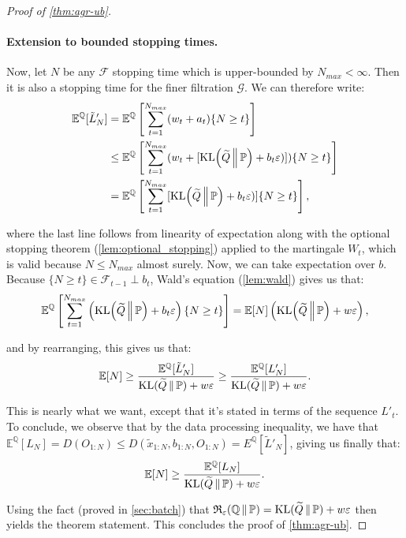 \documentclass{article}
\DeclareMathOperator{\KLop}{KL}
\newcommand{\KL}[2]{%
  \mathchoice
    {\KLop\!\left(#1\,\middle\|\,#2\right)}%
    {\KLop(#1\,\Vert\,#2)}%
    {\KLop(#1\,\Vert\,#2)}%
    {\KLop(#1\,\Vert\,#2)}%
}
\newcommand{\Rdiv}[3][\eps]{%
  \mathfrak{R}_{#1}\!\left(#2\,\middle\|\,#3\right)%
}
\newcommand{\Null}{\mathbb{P}}
\newcommand{\E}{\mathbb{E}}
\newcommand{\Alt}{\mathbb{Q}}
\newcommand{\opt}{\Rdiv{\Alt}{\Null}}
\newcommand{\eps}{\varepsilon}
\begin{document}
\begin{proof}[Proof of \cref{thm:agr-ub}]
    \paragraph{Extension to bounded stopping times. }
    Now, let $N$ be any $\mathcal{F}$ stopping time which is upper-bounded by $N_{max} < \infty$. Then it is also a stopping time for the finer filtration $\mathcal{G}$. We can therefore write:
    \begin{align*}
        \E^\Alt[\tilde L'_N] &= \E^\Alt\left[ \sum_{t=1}^{N_{max}} (w_t + a_t)\lbrace N \geq t\rbrace  \right] \\
        &\leq \E^\Alt\left[ \sum_{t=1}^{N_{max}} (w_t + [\KL{\widetilde Q}{\Null} + b_t\varepsilon)])\lbrace N \geq t\rbrace  \right] \\
        &= \E^\Alt\left[ \sum_{t=1}^{N_{max}} [\KL{\widetilde Q}{\Null} + b_t\varepsilon)]\lbrace N \geq t\rbrace  \right],
    \end{align*}

    where the last line follows from linearity of expectation along with the optional stopping theorem (\cref{lem:optional_stopping}) applied to the martingale $W_t$, which is valid because $N \leq N_{max}$ almost surely. Now, we can take expectation over $b$. Because $\lbrace N \geq t\rbrace \in \mathcal{F}_{t-1} \perp b_t$, Wald's equation (\cref{lem:wald}) gives us that:
    \begin{equation*}
        \E^\Alt\left[ \sum_{t=1}^{N_{max}} \left(\KL{\widetilde Q}{\Null} + b_t\varepsilon\right)\lbrace N \geq t\rbrace  \right] = \E[N]\left(\KL{\widetilde Q}{\Null} + w \varepsilon\right),
    \end{equation*}

    and by rearranging, this gives us that:
    \begin{equation*}
        \E[N] \geq \frac{\E^\Alt[\tilde L'_N]}{\KL{\widetilde Q}{\Null} + w \varepsilon} \geq \frac{\E^\Alt[L'_N]}{\KL{\widetilde Q}{\Null} + w \varepsilon}.
    \end{equation*}
    
    This is nearly what we want, except that it's stated in terms of the sequence $L'_t$. To conclude, we observe that by the data processing inequality, we have that $\E^\Alt[L_N] = D(O_{1:N}) \leq D(\tilde x_{1:N}, b_{1:N}, O_{1:N}) = E^\Alt[\tilde L'_N]$, giving us finally that:
    \begin{equation*}
        \E[N] \geq \frac{\E^\Alt[L_N]}{\KL{\widetilde Q}{\Null} + w \varepsilon}.
    \end{equation*}

    Using the fact (proved in \cref{sec:batch}) that $\opt = \KL{\widetilde Q}{\Null} + w\eps$ then yields the theorem statement. This concludes the proof of \cref{thm:agr-ub}.
\end{proof}
\end{document}
